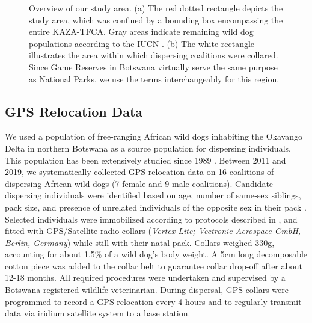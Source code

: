 \documentclass[abstract=on,10pt,a4paper,bibliography=totocnumbered]{article}
\begin{document}
\begin{figure}[h]
  \begin{center}
    \caption{Overview of our study area. (a) The red dotted rectangle depicts
    the study area, which was confined by a bounding box encompassing the entire
    KAZA-TFCA. Gray areas indicate remaining wild dog populations according to
    the IUCN \citep{Woodroffe.2012}. (b) The white rectangle illustrates the
    area within which dispersing coalitions were collared. Since Game Reserves
    in Botswana virtually serve the same purpose as National Parks, we use the
    terms interchangeably for this region.}
    \label{StudyArea}
  \end{center}
\end{figure}

\subsection{GPS Relocation Data}
We used a population of free-ranging African wild dogs inhabiting the Okavango
Delta in northern Botswana as a source population for dispersing individuals.
This population has been extensively studied since 1989 \citep{McNutt.1996,
Cozzi.2013, Cozzi.2020, Behr.2020}. Between 2011 and 2019, we systematically
collected GPS relocation data on 16 coalitions of dispersing African wild dogs
(7 female and 9 male coalitions). Candidate dispersing individuals were
identified based on age, number of same‐sex siblings, pack size, and presence of
unrelated individuals of the opposite sex in their pack \citep{McNutt.1996,
Behr.2020}. Selected individuals were immobilized according to protocols
described in \cite{Osofsky.1996}, and fitted with GPS/Satellite radio collars
(\textit{Vertex Lite; Vectronic Aerospace GmbH, Berlin, Germany}) while still
with their natal pack. Collars weighed 330g, accounting for about 1.5\% of a
wild dog's body weight. A 5cm long decomposable cotton piece was added to the
collar belt to guarantee collar drop-off after about 12-18 months. All required
procedures were undertaken and supervised by a Botswana-registered wildlife
veterinarian. During dispersal, GPS collars were programmed to record a GPS
relocation every 4 hours and to regularly transmit data via iridium satellite
system to a base station.
\end{document}
